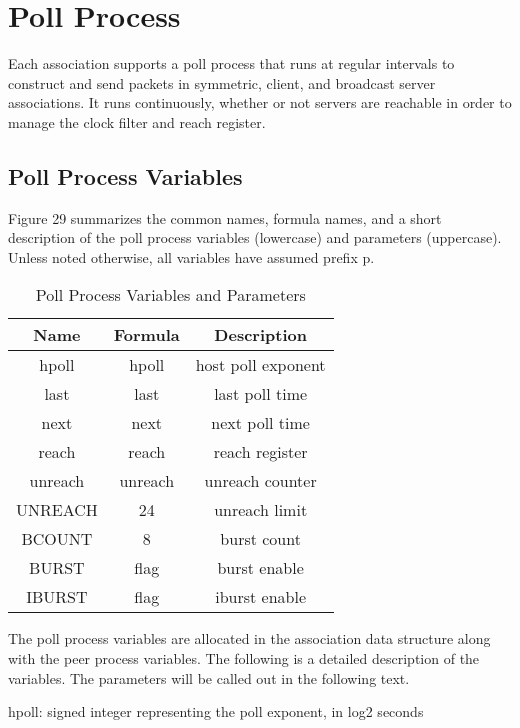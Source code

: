 \chapter{Poll Process}

Each association supports a poll process that runs at regular
intervals to construct and send packets in symmetric, client, and
broadcast server associations.  It runs continuously, whether or not
servers are reachable in order to manage the clock filter and reach
register.

\section{Poll Process Variables}

Figure 29 summarizes the common names, formula names, and a short
description of the poll process variables (lowercase) and parameters
(uppercase).  Unless noted otherwise, all variables have assumed
prefix p.

\begin{table}[htb]
\center
\begin{tabular}{c | c | c}
Name    & Formula & Description        \\
\hline
\hline
hpoll   & hpoll   & host poll exponent \\
last    & last    & last poll time     \\
next    & next    & next poll time     \\
reach   & reach   & reach register     \\
unreach & unreach & unreach counter    \\
UNREACH & 24      & unreach limit      \\
BCOUNT  & 8       & burst count        \\
BURST   & flag    & burst enable       \\
IBURST  & flag    & iburst enable      \\
\hline
\end{tabular}
\label{poll_process_variables_and_parameters}
\caption{Poll Process Variables and Parameters}
\end{table}

The poll process variables are allocated in the association data
structure along with the peer process variables.  The following is a
detailed description of the variables.  The parameters will be called
out in the following text.

hpoll: signed integer representing the poll exponent, in log2 seconds

